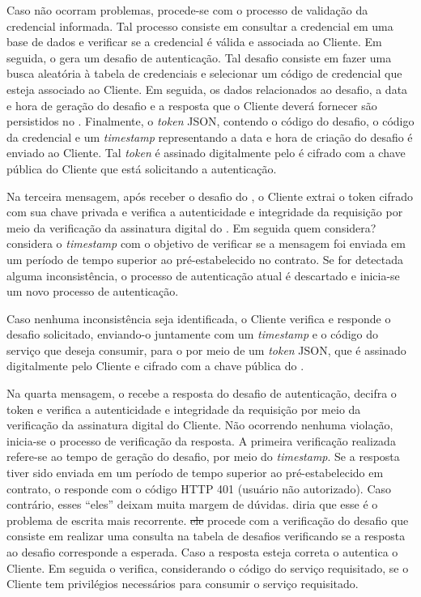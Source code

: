 Caso não ocorram problemas, procede-se com o processo de validação da credencial informada. Tal processo consiste em
consultar a credencial em uma base de dados e verificar se a credencial \'{e} válida e associada ao Cliente. Em seguida, o \servidorAA{}
gera um desafio de autenticação. Tal desafio consiste em fazer uma busca aleatória à tabela de credenciais e selecionar um código de
credencial que esteja associado ao Cliente. Em seguida, os dados relacionados ao desafio, a data e hora de geração do desafio e a resposta que o Cliente deverá
fornecer s\~{a}o persistidos no \servidorBD. Finalmente, o \emph{token} JSON, contendo o código do desafio, o código da credencial e um \emph{timestamp} representando a data e hora de criação do desafio é enviado ao Cliente. Tal \emph{token} \'{e} assinado digitalmente pelo \servidorAA{} \'{e} cifrado com a chave pública do
Cliente que está solicitando a autenticação.

Na terceira mensagem, após receber o desafio do \servidorAA, o Cliente extrai o token cifrado com sua chave
privada e verifica a autenticidade e integridade da requisição por meio da verificação da assinatura digital do \servidorAA.
Em seguida {\color{red}quem considera?} considera o \emph{timestamp} com o objetivo de verificar se a mensagem foi
enviada em um período de tempo superior ao pré-estabelecido no contrato. Se for detectada alguma inconsist\^{e}ncia,
o processo de autenticação atual é descartado e inicia-se um novo processo de autenticação.

Caso nenhuma inconsist\^{e}ncia seja identificada, o Cliente verifica e responde o desafio solicitado, enviando-o
juntamente com um \emph{timestamp} e o código do serviço que deseja consumir, para o \servidorAA{}
por meio de um \emph{token} JSON, que é assinado digitalmente pelo Cliente e cifrado com a chave pública do \servidorAA.

Na quarta mensagem, o \servidorAA{} recebe a resposta do desafio de autenticação, decifra o token e verifica a autenticidade e integridade
da requisição por meio da verificação da assinatura digital do Cliente.  Não ocorrendo nenhuma viola\c c\~{a}o, inicia-se o processo de
verificação da resposta. A primeira verificação realizada refere-se ao tempo de geração do desafio, por meio do \emph{timestamp}. Se a resposta
tiver sido enviada em um período de tempo superior ao pré-estabelecido em contrato, o \servidorAA{} responde com o
c\'{o}digo HTTP 401 (usuário não autorizado). Caso contrário, {\color{red}esses ``eles'' deixam muita margem de d\'{u}vidas. diria que esse \'{e} o
problema de escrita mais recorrente.} \sout{ele} procede com a verificação do desafio que consiste em realizar uma consulta na tabela de desafios
verificando se a resposta ao desafio corresponde a esperada. Caso a resposta esteja correta o \servidorAA{}
autentica o Cliente. Em seguida o \servidorAA{} verifica, considerando o código do serviço requisitado,
se o Cliente tem privilégios necessários para consumir o serviço requisitado.

